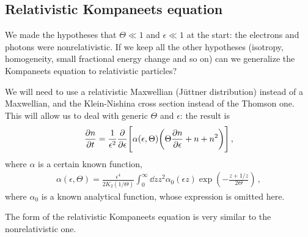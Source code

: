 \documentclass[main.tex]{subfiles}
\begin{document}

\subsection{Relativistic Kompaneets equation}

We made the hypotheses that \(\Theta \ll 1\) and \(\epsilon \ll 1\) at the start: the electrons and photons were nonrelativistic.
If we keep all the other hypotheses (isotropy, homogeneity, small fractional energy change and so on) can we generalize the Kompaneets equation to relativistic particles?

We will need to use a relativistic Maxwellian (Jüttner distribution) instead of a Maxwellian, and the Klein-Nishina cross section instead of the Thomson one. This will allow us to deal with generic \(\Theta \) and \(\epsilon \): the result is 
%
\begin{align}
\pdv{n}{t} = \frac{1}{\epsilon^2} \pdv{}{\epsilon } \qty[ \alpha (\epsilon , \Theta ) \qty(\Theta \pdv{n}{\epsilon } + n + n^2)]
\,,
\end{align}
%
where \(\alpha \) is a certain known function, 
%
\begin{align}
\alpha (\epsilon , \Theta ) = \frac{\epsilon^4}{2 K_2 (1 / \Theta )} \int_0^{\infty } \dd{z} z^2 \alpha_0 (\epsilon z) \exp( - \frac{z + 1/z}{2 \Theta })
\,,
\end{align}
%
where \(\alpha_0\) is a known analytical function, whose expression is omitted here. 

The form of the relativistic Kompaneets equation is very similar to the nonrelativistic one. 

\end{document}

